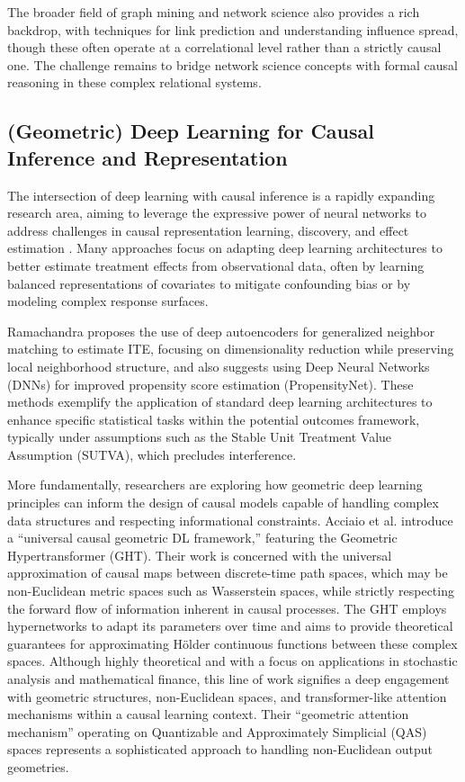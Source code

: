 The broader field of graph mining and network science also provides a rich backdrop, with techniques for link prediction and understanding influence spread, though these often operate at a correlational level rather than a strictly causal one. The challenge remains to bridge network science concepts with formal causal reasoning in these complex relational systems.

\subsection{(Geometric) Deep Learning for Causal Inference and Representation}
\label{subsec:geometric_dl_causality}

The intersection of deep learning with causal inference is a rapidly expanding research area, aiming to leverage the expressive power of neural networks to address challenges in causal representation learning, discovery, and effect estimation \cite{deng2022deep, jiao2024causal}. Many approaches focus on adapting deep learning architectures to better estimate treatment effects from observational data, often by learning balanced representations of covariates to mitigate confounding bias or by modeling complex response surfaces.

Ramachandra \cite{ramachandra2018deep} proposes the use of deep autoencoders for generalized neighbor matching to estimate ITE, focusing on dimensionality reduction while preserving local neighborhood structure, and also suggests using Deep Neural Networks (DNNs) for improved propensity score estimation (PropensityNet). These methods exemplify the application of standard deep learning architectures to enhance specific statistical tasks within the potential outcomes framework, typically under assumptions such as the Stable Unit Treatment Value Assumption (SUTVA), which precludes interference.

More fundamentally, researchers are exploring how geometric deep learning principles can inform the design of causal models capable of handling complex data structures and respecting informational constraints. Acciaio et al. \cite{acciaio2024designing} introduce a ``universal causal geometric DL framework,'' featuring the Geometric Hypertransformer (GHT). Their work is concerned with the universal approximation of causal maps between discrete-time path spaces, which may be non-Euclidean metric spaces such as Wasserstein spaces, while strictly respecting the forward flow of information inherent in causal processes. The GHT employs hypernetworks to adapt its parameters over time and aims to provide theoretical guarantees for approximating H\"{o}lder continuous functions between these complex spaces. Although highly theoretical and with a focus on applications in stochastic analysis and mathematical finance, this line of work signifies a deep engagement with geometric structures, non-Euclidean spaces, and transformer-like attention mechanisms within a causal learning context. Their ``geometric attention mechanism'' operating on Quantizable and Approximately Simplicial (QAS) spaces represents a sophisticated approach to handling non-Euclidean output geometries.

